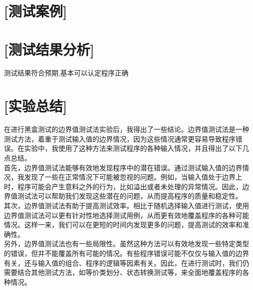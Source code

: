 \documentclass{article}
\newcommand{\blue}{\begin{tabular}{|l|c|c|c|r|}
\hline
  a & b & c & 测试输出 & 预期输出\\
\hline

  

\end{tabular}}
\newcommand{\bluetitle}{三角形测试数据}
\begin{document}
\section{[测试案例]}


\renewcommand{\blue}{\begin{tabular}{|l|c|c|c|r|}
  \hline
  y & m & d & 测试输出 & 预期输出\\
  \hline

  

\end{tabular}}
\renewcommand{\bluetitle}{NextDay测试数据}



\section{[测试结果分析]}

测试结果符合预期,基本可以认定程序正确\\

\section{[实验总结]}

在进行黑盒测试的边界值测试法实验后，我得出了一些结论。边界值测试法是一种测试方法，着重于测试输入值的边界情况，因为这些情况通常更容易导致程序错误。在实验中，我使用了这种方法来测试程序的各种输入情况，并且得出了以下几点总结。\\

首先，边界值测试法能够有效地发现程序中的潜在错误。通过测试输入值的边界情况，我发现了一些在正常情况下可能被忽视的问题。例如，当输入值处于边界上时，程序可能会产生意料之外的行为，比如溢出或者未处理的异常情况。因此，边界值测试法可以帮助我们发现这些潜在的问题，从而提高程序的质量和稳定性。\\

其次，边界值测试法有助于提高测试效率。相比于随机选择输入值进行测试，使用边界值测试法可以更有针对性地选择测试用例，从而更有效地覆盖程序的各种可能情况。这样一来，我们可以在更短的时间内发现更多的问题，提高测试的效率和准确性。\\

另外，边界值测试法也有一些局限性。虽然这种方法可以有效地发现一些特定类型的错误，但并不能覆盖所有可能的情况。有些程序错误可能不仅仅与输入值的边界有关，还与输入值的组合、程序的逻辑等因素有关。因此，在进行测试时，我们仍需要结合其他测试方法，如等价类划分、状态转换测试等，来全面地覆盖程序的各种情况。\\
\end{document}
